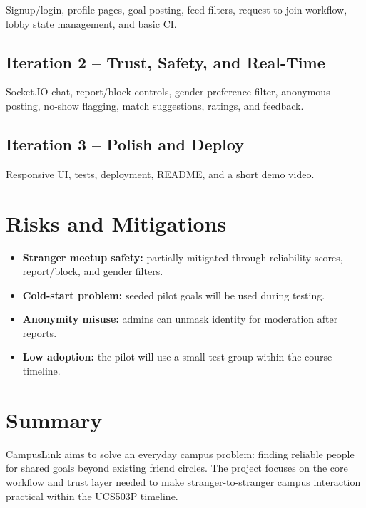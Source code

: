 \documentclass[12pt,a4paper]{article}
\begin{document}
Signup/login, profile pages, goal posting, feed filters, request-to-join workflow, lobby state management, and basic CI.

\subsection{Iteration 2 -- Trust, Safety, and Real-Time}

Socket.IO chat, report/block controls, gender-preference filter, anonymous posting, no-show flagging, match suggestions, ratings, and feedback.

\subsection{Iteration 3 -- Polish and Deploy}

Responsive UI, tests, deployment, README, and a short demo video.

\section{Risks and Mitigations}

\begin{itemize}[leftmargin=*]
  \item \textbf{Stranger meetup safety:} partially mitigated through reliability scores, report/block, and gender filters.
  \item \textbf{Cold-start problem:} seeded pilot goals will be used during testing.
  \item \textbf{Anonymity misuse:} admins can unmask identity for moderation after reports.
  \item \textbf{Low adoption:} the pilot will use a small test group within the course timeline.
\end{itemize}

\section{Summary}

CampusLink aims to solve an everyday campus problem: finding reliable people for shared goals beyond existing friend circles. The project focuses on the core workflow and trust layer needed to make stranger-to-stranger campus interaction practical within the UCS503P timeline.
\end{document}
